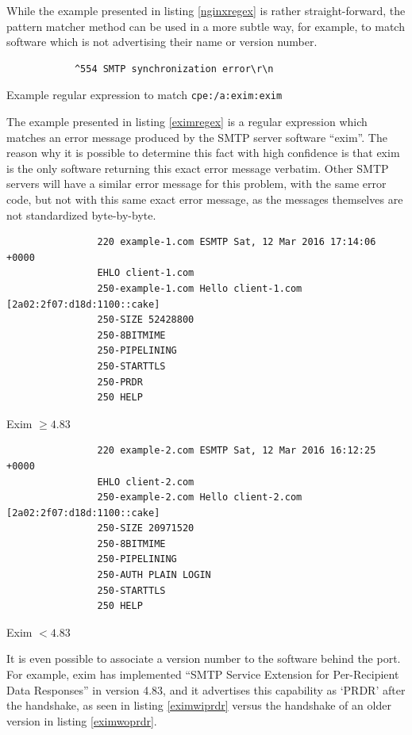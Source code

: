 \documentclass[a4paper,12pt]{article}
\begin{document}
	While the example presented in listing \ref{nginxregex} is rather straight-forward, the pattern matcher method can be used in a more subtle way, for example, to match software which is not advertising their name or version number.
	
	\begin{listing}[H]
		\begin{verbatim}
			^554 SMTP synchronization error\r\n
		\end{verbatim}
		\caption{Example regular expression to match \texttt{cpe:/a:exim:exim}}
		\label{eximregex}
	\end{listing}
	
	The example presented in listing \ref{eximregex} is a regular expression which matches an error message produced by the SMTP server software ``exim''. The reason why it is possible to determine this fact with high confidence is that exim is the only software returning this exact error message verbatim. Other SMTP servers will have a similar error message for this problem, with the same error code, but not with this same exact error message, as the messages themselves are not standardized byte-by-byte.
	
	\begin{multicols}{2}
		\begin{listing}[H]
			\begin{verbatim}
				220 example-1.com ESMTP Sat, 12 Mar 2016 17:14:06 +0000
				EHLO client-1.com
				250-example-1.com Hello client-1.com [2a02:2f07:d18d:1100::cake]
				250-SIZE 52428800
				250-8BITMIME
				250-PIPELINING
				250-STARTTLS
				250-PRDR
				250 HELP
			\end{verbatim}
			\caption{Exim $\ge 4.83$}
			\label{eximwiprdr}
		\end{listing}
		\begin{listing}[H]
			\begin{verbatim}
				220 example-2.com ESMTP Sat, 12 Mar 2016 16:12:25 +0000
				EHLO client-2.com
				250-example-2.com Hello client-2.com [2a02:2f07:d18d:1100::cake]
				250-SIZE 20971520
				250-8BITMIME
				250-PIPELINING
				250-AUTH PLAIN LOGIN
				250-STARTTLS
				250 HELP
			\end{verbatim}
			\caption{Exim $< 4.83$}
			\label{eximwoprdr}
		\end{listing}
	\end{multicols}
	
	It is even possible to associate a version number to the software behind the port. For example, exim has implemented ``SMTP Service Extension for Per-Recipient Data Responses'' in version 4.83, and it advertises this capability as `PRDR' after the handshake, as seen in listing \ref{eximwiprdr} versus the handshake of an older version in listing \ref{eximwoprdr}.
	
\end{document}
